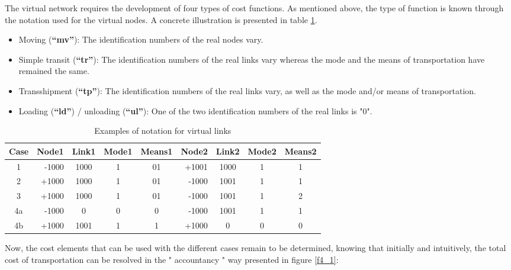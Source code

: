The virtual network requires the development of four types of cost functions. As
mentioned above, the type of function is known through the notation used for the
virtual nodes. A concrete illustration is presented in table
\ref{tab4_1}.

\begin{itemize}
  \item Moving (\textbf{``mv''}): The identification numbers of the real nodes vary.
  \item Simple transit (\textbf{``tr''}): The identification numbers of the real links vary
whereas the mode and the means of transportation have remained the same.
  \item Transshipment (\textbf{``tp''}): The identification numbers of the real links vary,
as well as the mode and/or means of transportation.
  \item Loading (\textbf{``ld''}) / unloading (\textbf{``ul''}): One of the two identification numbers of the real
links is "0".
\end{itemize}



\begin{table}[htbp]
\begin{center}
\begin{tabular}{crcccrccc}
\hline


Case &Node1 &Link1 &Mode1 &Means1 &Node2 &Link2 &Mode2 &Means2\\
\hline
1 &-1000 &1000  &1 &01 &+1001 &1000 &1 &1\\

2 &+1000 &1000 &1 &01 &-1000 &1001 &1 &1\\

3 &+1000 &1000 &1 &01 &-1000 &1001 &1 &2 \\

4a &-1000 &0 &0 &0 &-1000 &1001 &1 &1\\

4b &+1000 &1001 &1 &1 &+1000 &0 &0 &0\\
\hline
\end{tabular}
\caption{\label{tab4_1} Examples of notation for virtual links}
\end{center}
\end{table}

Now, the cost elements that can be used with the different cases
remain to be determined, knowing that initially and intuitively, the total cost of
transportation can be resolved in the " accountancy " way presented in figure \ref{f4_1}:

